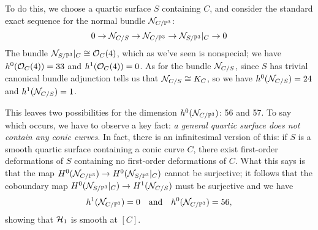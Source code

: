 To do this, we choose a quartic surface $S$ containing $C$, and consider the standard exact sequence for the normal bundle ${\mathcal N}_{C/{\mathbb P}^3}$:
$$
0 \to {\mathcal N}_{C/S} \to {\mathcal N}_{C/{\mathbb P}^3} \to {\mathcal N}_{S/{\mathbb P}^3}|_C \to 0
$$
The bundle ${\mathcal N}_{S/{\mathbb P}^3}|_C \cong {\mathcal O}_C(4)$, which as we've seen is nonspecial; we have $h^0({\mathcal O}_C(4)) = 33$ and $h^1({\mathcal O}_C(4)) = 0$. As for the bundle ${\mathcal N}_{C/S}$,  since $S$ has trivial canonical bundle adjunction tells us that ${\mathcal N}_{C/S} \cong K_C$, so we have $h^0({\mathcal N}_{C/S}) = 24$ and $h^1({\mathcal N}_{C/S}) = 1$.

This leaves two possibilities for the dimension $h^0({\mathcal N}_{C/{\mathbb P}^3})$: 56 and 57. To say which occurs, we have to observe a key fact: \emph{a general quartic surface does not contain any conic curves}. In fact, there is an infinitesimal version of this: if $S$ is a smooth quartic surface containing a conic curve $C$, there exist first-order deformations of $S$ containing no first-order deformations of $C$. What this says is that the map
$H^0({\mathcal N}_{C/{\mathbb P}^3}) \to H^0({\mathcal N}_{S/{\mathbb P}^3}|_C)$ cannot be surjective; it follows that the coboundary map $H^0({\mathcal N}_{S/{\mathbb P}^3}|_C) \to H^1({\mathcal N}_{C/S})$ must be surjective and we have
$$
h^1({\mathcal N}_{C/{\mathbb P}^3}) = 0 \quad \text{and} \quad h^0({\mathcal N}_{C/{\mathbb P}^3}) = 56,
$$
showing that ${\cal H}_1$ is smooth at $[C]$.

